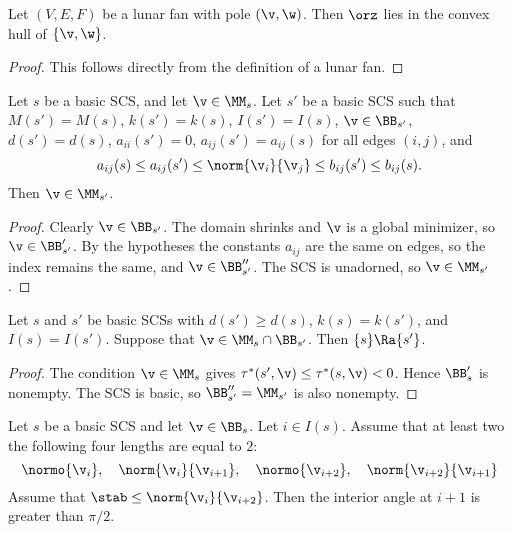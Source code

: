 \begin{lemma}[]
Let $(V,E,F)$ be a lunar fan with pole $(\v,\w)$.  Then $\orz$ lies in the convex hull of $\{\v,\w\}$.
\end{lemma}

\begin{proof} This follows directly from the definition of a lunar fan.
\end{proof}

\begin{lemma}[]\label{lemma:transfer-prelim} 
Let $s$ be a basic SCS, and let $\v\in \MM_s$.  Let $s'$ be a basic SCS such that
$M(s')=M(s)$, $k(s')=k(s)$, $I(s')=I(s)$,  $\v\in \BB_{s'}$, $d(s')=d(s)$, $a_{ii}(s')=0$,
$a_{ij}(s') = a_{ij}(s)$ for all edges $(i,j)$, and
\[
a_{ij} (s) \le a_{ij}(s') \le \norm{\v_i}{\v_j} \le b_{ij}(s') \le b_{ij}(s).
\]
Then  $\v\in \MM_{s'}$.
\end{lemma}

\begin{proof} 
Clearly $\v\in \BB_{s'}$.  
The domain shrinks and $\v$ is a global minimizer, so $\v\in \BB'_{s'}$.
By the hypotheses the constants $a_{ij}$ are the same on edges, so the index remains the same, and $\v\in \BB''_{s'}$.
The SCS is unadorned, so $\v\in \MM_{s'}$.
\end{proof}

\begin{lemma}[]
Let $s$ and $s'$ be basic SCSs with $d(s') \ge d(s)$,  $k(s) = k(s')$, and $I(s) = I(s')$.
Suppose that $\v\in \MM_s \cap \BB_{s'}$.
Then $\{s\}\Ra \{s'\}$.
\end{lemma}

\begin{proof}
The condition $\v\in\MM_s$ gives $\tau^*(s',\v)\le \tau^*(s,\v)<0$.  Hence $\BB'_s$ is nonempty.
The SCS is basic, so $\BB''_{s'} = \MM_{s'}$ is also nonempty.
\end{proof}

\begin{lemma}\label{lemma:scs-obtuse}
Let $s$ be a basic SCS and let $\v\in \BB_s$. Let $i\in I(s)$.
Assume that at least two the following four lengths are equal to $2$:
\[
\normo{\v_i},\quad \norm{\v_i}{\v_{i+1}},\quad
\normo{\v_{i+2}},\quad \norm{\v_{i+2}}{\v_{i+1}}
\]
Assume that $\stab\le \norm{\v_i}{\v_{i+2}}$.  Then the interior angle at $i+1$ is
greater than $\pi/2$.
\end{lemma}

